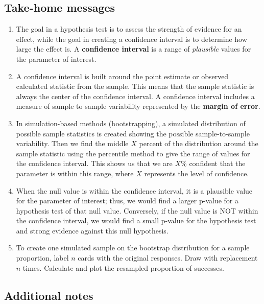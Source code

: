 \documentclass[
]{report}
\begin{document}

\subsection{Take-home messages}\label{take-home-messages-5}

\begin{enumerate}
\def\labelenumi{\arabic{enumi}.}
\item
  The goal in a hypothesis test is to assess the strength of evidence for an effect, while the goal in creating a confidence interval is to determine how large the effect is. A \textbf{confidence interval} is a range of \emph{plausible} values for the parameter of interest.
\item
  A confidence interval is built around the point estimate or observed calculated statistic from the sample. This means that the sample statistic is always the center of the confidence interval. A confidence interval includes a measure of sample to sample variability represented by the \textbf{margin of error}.
\item
  In simulation-based methods (bootstrapping), a simulated distribution of possible sample statistics is created showing the possible sample-to-sample variability. Then we find the middle \(X\) percent of the distribution around the sample statistic using the percentile method to give the range of values for the confidence interval. This shows us that we are \(X\)\% confident that the parameter is within this range, where \(X\) represents the level of confidence.
\item
  When the null value is within the confidence interval, it is a plausible value for the parameter of interest; thus, we would find a larger p-value for a hypothesis test of that null value. Conversely, if the null value is NOT within the confidence interval, we would find a small p-value for the hypothesis test and strong evidence against this null hypothesis.
\item
  To create one simulated sample on the bootstrap distribution for a sample proportion, label \(n\) cards with the original responses. Draw with replacement \(n\) times. Calculate and plot the resampled proportion of successes.
\end{enumerate}

\subsection{Additional notes}\label{additional-notes-5}
\end{document}
